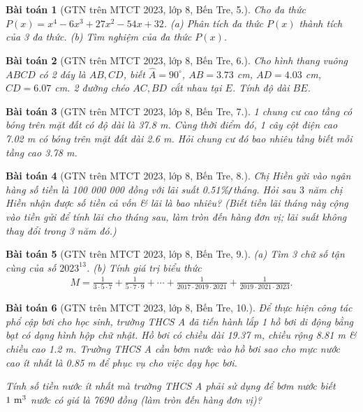 \documentclass{article}
\newtheorem{baitoan}{Bài toán}
\begin{document}
\begin{baitoan}[GTN trên MTCT 2023, lớp 8, Bến Tre, 5.]
	Cho đa thức $P(x) = x^4 - 6x^3 + 27x^2 - 54x + 32$. (a) Phân tích đa thức $P(x)$ thành tích của 3 đa thức. (b) Tìm nghiệm của đa thức $P(x)$.
\end{baitoan}

\begin{baitoan}[GTN trên MTCT 2023, lớp 8, Bến Tre, 6.]
	Cho hình thang vuông $ABCD$ có 2 đáy là $AB,CD$, biết $\widehat{A} = 90^\circ$, $AB = 3.73$ \emph{cm}, $AD = 4.03$ \emph{cm}, $CD = 6.07$ \emph{cm}. 2 đường chéo $AC,BD$ cắt nhau tại $E$. Tính độ dài $BE$.
\end{baitoan}

\begin{baitoan}[GTN trên MTCT 2023, lớp 8, Bến Tre, 7.]
	1 chung cư cao tầng có bóng trên mặt đất có độ dài là \emph{37.8 m}. Cùng thời điểm đó, 1 cây cột điện cao \emph{7.02 m} có bóng trên mặt đất dài \emph{2.6 m}. Hỏi chung cư đó bao nhiêu tầng biết mỗi tầng cao \emph{3.78 m}.
\end{baitoan}

\begin{baitoan}[GTN trên MTCT 2023, lớp 8, Bến Tre, 8.]
	Chị Hiền gửi vào ngân hàng số tiền là \emph{100 000 000 đồng} với lãi suất \emph{0.51\%\texttt{/}tháng}. Hỏi sau $3$ năm chị Hiền nhận được số tiền cả vốn \& lãi là bao nhiêu? (Biết tiền lãi tháng này cộng vào tiền gửi để tính lãi cho tháng sau, làm tròn đến hàng đơn vị; lãi suất không thay đổi trong 3 năm đó.)
\end{baitoan}

\begin{baitoan}[GTN trên MTCT 2023, lớp 8, Bến Tre, 9.]
	(a) Tìm 3 chữ số tận cùng của số $2023^{13}$. (b) Tính giá trị biểu thức
	\begin{align*}
		M = \frac{1}{3\cdot5\cdot7} + \frac{1}{5\cdot7\cdot9} + \cdots + \frac{1}{2017\cdot2019\cdot2021} + \frac{1}{2019\cdot2021\cdot2023}.
	\end{align*}
\end{baitoan}

\begin{baitoan}[GTN trên MTCT 2023, lớp 8, Bến Tre, 10.]
	Để thực hiện công tác phổ cập bơi cho học sinh, trường THCS A đã tiến hành lắp 1 hồ bơi di động bằng bạt có dạng hình hộp chữ nhật. Hồ bơi có chiều dài \emph{19.37 m}, chiều rộng \emph{8.81 m} \& chiều cao \emph{1.2 m}. Trường THCS A cần bơm nước vào hồ bơi sao cho mực nước cao ít nhất là \emph{0.85 m} để phục vụ cho việc dạy học bơi.
	
	Tính số tiền nước ít nhất mà trường THCS A phải sử dụng để bơm nước biết $\rm 1\ m^3$ nước có giá là \emph{7690 đồng} (làm tròn đến hàng đơn vị)?
\end{baitoan}
\end{document}
